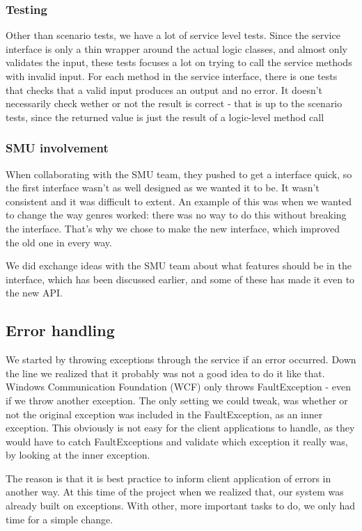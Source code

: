 \subsubsection{Testing}
Other than scenario tests, we have a lot of service level tests. Since the service interface is only a thin wrapper around the actual logic classes, and almost only validates the input, these tests focuses a lot on trying to call the service methods with invalid input. For each method in the service interface, there is one tests that checks that a valid input produces an output and no error. It doesn't necessarily check wether or not the result is correct - that is up to the scenario tests, since the returned value is just the result of a logic-level method call

\subsubsection{SMU involvement}
\label{Design_Service_Interface_SMU}
When collaborating with the SMU team, they pushed to get a interface quick, so the first interface wasn't as well designed as we wanted it to be. It wasn't consistent and it was difficult to extent. An example of this was when we wanted to change the way genres worked: there was no way to do this without breaking the interface. That's why we chose to make the new interface, which improved the old one in every way.

We did exchange ideas with the SMU team about what features should be in the interface, which has been discussed earlier, and some of these has made it even to the new API.

\subsection{Error handling}
\label{Implementation_Service_Error}

We started by throwing exceptions through the service if an error occurred. Down the line we realized that it probably was not a good idea to do it like that. Windows Communication Foundation (WCF) only throws FaultException - even if we throw another exception. The only setting we could tweak, was whether or not the original exception was included in the FaultException, as an inner exception. This obviously is not easy for the client applications to handle, as they would have to catch FaultExceptions and validate which exception it really was, by looking at the inner exception.

The reason is that it is best practice to inform client application of errors in another way. At this time of the project when we realized that, our system was already built on exceptions. With other, more important tasks to do, we only had time for a simple change.

